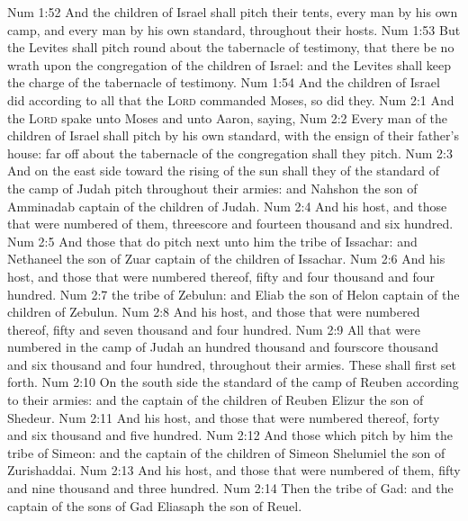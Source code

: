 \vs Num 1:52 And the children of Israel shall pitch their tents, every man by his own camp, and every man by his own standard, throughout their hosts.
\vs Num 1:53 But the Levites shall pitch round about the tabernacle of testimony, that there be no wrath upon the congregation of the children of Israel: and the Levites shall keep the charge of the tabernacle of testimony.
\vs Num 1:54 And the children of Israel did according to all that the \textsc{Lord} commanded Moses, so did they.
\vs Num 2:1 And the \textsc{Lord} spake unto Moses and unto Aaron, saying,
\vs Num 2:2 Eve\-ry man of the children of Israel shall pitch by his own standard, with the ensign of their father's house: far off about the tabernacle of the congregation shall they pitch.
\vs Num 2:3 And on the east side toward the rising of the sun shall they of the standard of the camp of Judah pitch throughout their armies: and Nahshon the son of Amminadab  captain of the children of Judah.
\vs Num 2:4 And his host, and those that were numbered of them,  threescore and fourteen thousand and six hundred.
\vs Num 2:5 And those that do pitch next unto him  the tribe of Issachar: and Nethaneel the son of Zuar  captain of the children of Issachar.
\vs Num 2:6 And his host, and those that were numbered thereof,  fifty and four thousand and four hundred.
\vs Num 2:7  the tribe of Zebulun: and Eliab the son of Helon  captain of the children of Zebulun.
\vs Num 2:8 And his host, and those that were numbered thereof,  fifty and seven thousand and four hundred.
\vs Num 2:9 All that were numbered in the camp of Judah  an hundred thousand and fourscore thousand and six thousand and four hundred, throughout their armies. These shall first set forth.
\vs Num 2:10 On the south side  the standard of the camp of Reuben according to their armies: and the captain of the children of Reuben  Elizur the son of Shedeur.
\vs Num 2:11 And his host, and those that were numbered thereof,  forty and six thousand and five hundred.
\vs Num 2:12 And those which pitch by him  the tribe of Simeon: and the captain of the children of Simeon  Shelumiel the son of Zurishaddai.
\vs Num 2:13 And his host, and those that were numbered of them,  fifty and nine thousand and three hundred.
\vs Num 2:14 Then the tribe of Gad: and the captain of the sons of Gad  Eliasaph the son of Reuel.
